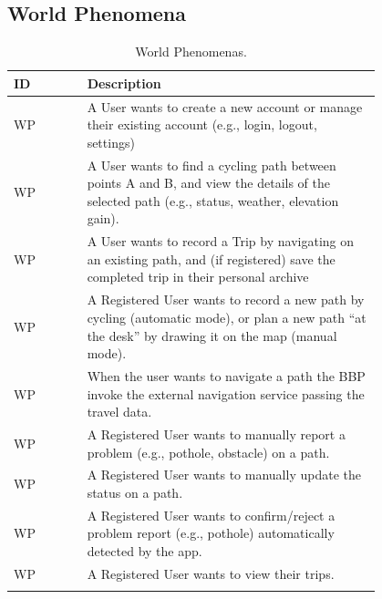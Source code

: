 \newpage

\subsection{World Phenomena}
\label{subsec:world_phenomena}%
\setcounter{wp}{1}
\newcommand{\cwp}{\thewp\stepcounter{wp}}
\begin{center}
    \begin{longtable}{ |l|p{0.8\linewidth}| }
        \hline
        \textbf{ID} & \textbf{Description}                               \\
        \hline
        WP\cwp      & A User wants to create a new account or manage their existing account (e.g., login, logout, settings)  \\
        \hline
        WP\cwp      & A User wants to find a cycling path between points A and B, and view the details of the selected path (e.g., status, weather, elevation gain).   \\
        \hline
        WP\cwp      & A User wants to record a Trip by navigating on an existing path, and (if registered) save the completed trip in their personal archive  \\
        \hline
        WP\cwp      & A Registered User wants to record a new path by cycling (automatic mode), or plan a new path “at the desk” by drawing it on the map (manual mode).   \\
        \hline
        WP\cwp      & When the user wants to navigate a path the BBP invoke the external navigation service passing the travel data.   \\
        \hline
        WP\cwp      & A Registered User wants to manually report a problem (e.g., pothole, obstacle) on a path.   \\
        \hline
        WP\cwp      & A Registered User wants to manually update the status on a path.   \\
        \hline
        WP\cwp      & A Registered User wants to confirm/reject a problem report (e.g., pothole) automatically detected by the app.   \\
        \hline
        WP\cwp      & A Registered User wants to view their trips.  \\
        \hline
        \caption{World Phenomenas.}
        \label{tab:worldph_tab}%
    \end{longtable}
\end{center}

\newpage
